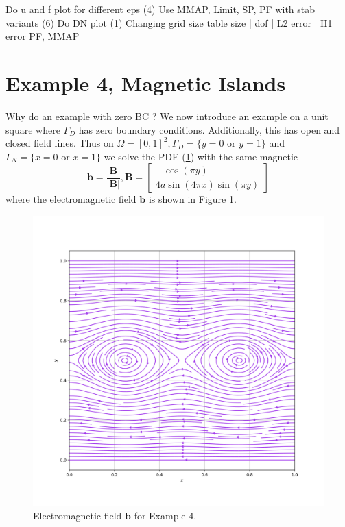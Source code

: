 \documentclass[12pt,a4paper]{article}
\begin{document}
Do u and f plot for different eps (4)
Use MMAP, Limit, SP, PF
with stab variants (6)
Do DN plot (1)
Changing grid size table 
size | dof | L2 error | H1 error PF, MMAP

\section{Example 4, Magnetic Islands}
Why do an example with zero BC ?
We now introduce an example on a unit square where $\Gamma_D$ has zero boundary conditions. Additionally, this has open and closed field lines.
Thus on $\Omega = [0,1]^2, \Gamma_D = \{y=0 \text{ or } y=1\}$ and $\Gamma_N = \{x=0 \text{ or } x=1\}$ we solve the PDE (\ref{}) with the same magnetic
\begin{equation}
\mathbf{b} = \frac{\mathbf{B}}{|\mathbf{B}|}, 
\mathbf{B} = \left[ \begin{matrix}
-\cos(\pi y)\\
4a \sin(4 \pi x) \sin(\pi y)
\end{matrix} \right]
\end{equation}
where the electromagnetic field $\mathbf{b}$ is shown in Figure \ref{E4_VF}.
\begin{figure}[H]
 \includegraphics[width=\textwidth]{Pics/VectorField/E4b.png}
  \caption{Electromagnetic field $\mathbf{b}$ for Example $4$.}
 \label{E4_VF}
\end{figure}
\end{document}
